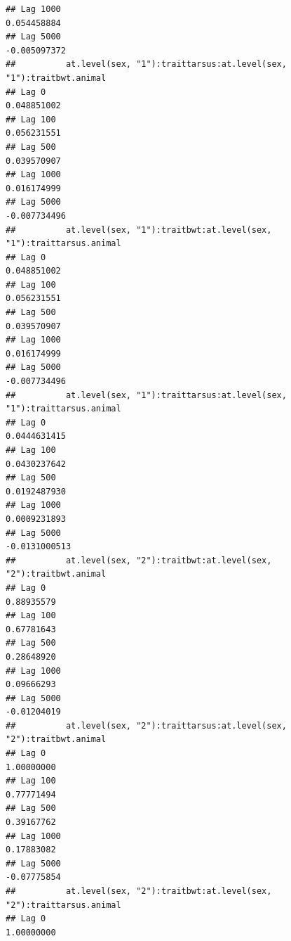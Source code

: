 \documentclass[
  12pt,
]{book}
\begin{document}
\begin{verbatim}
## Lag 1000                                                    0.054458884
## Lag 5000                                                   -0.005097372
##          at.level(sex, "1"):traittarsus:at.level(sex, "1"):traitbwt.animal
## Lag 0                                                          0.048851002
## Lag 100                                                        0.056231551
## Lag 500                                                        0.039570907
## Lag 1000                                                       0.016174999
## Lag 5000                                                      -0.007734496
##          at.level(sex, "1"):traitbwt:at.level(sex, "1"):traittarsus.animal
## Lag 0                                                          0.048851002
## Lag 100                                                        0.056231551
## Lag 500                                                        0.039570907
## Lag 1000                                                       0.016174999
## Lag 5000                                                      -0.007734496
##          at.level(sex, "1"):traittarsus:at.level(sex, "1"):traittarsus.animal
## Lag 0                                                            0.0444631415
## Lag 100                                                          0.0430237642
## Lag 500                                                          0.0192487930
## Lag 1000                                                         0.0009231893
## Lag 5000                                                        -0.0131000513
##          at.level(sex, "2"):traitbwt:at.level(sex, "2"):traitbwt.animal
## Lag 0                                                        0.88935579
## Lag 100                                                      0.67781643
## Lag 500                                                      0.28648920
## Lag 1000                                                     0.09666293
## Lag 5000                                                    -0.01204019
##          at.level(sex, "2"):traittarsus:at.level(sex, "2"):traitbwt.animal
## Lag 0                                                           1.00000000
## Lag 100                                                         0.77771494
## Lag 500                                                         0.39167762
## Lag 1000                                                        0.17883082
## Lag 5000                                                       -0.07775854
##          at.level(sex, "2"):traitbwt:at.level(sex, "2"):traittarsus.animal
## Lag 0                                                           1.00000000

\end{verbatim}
\end{document}
